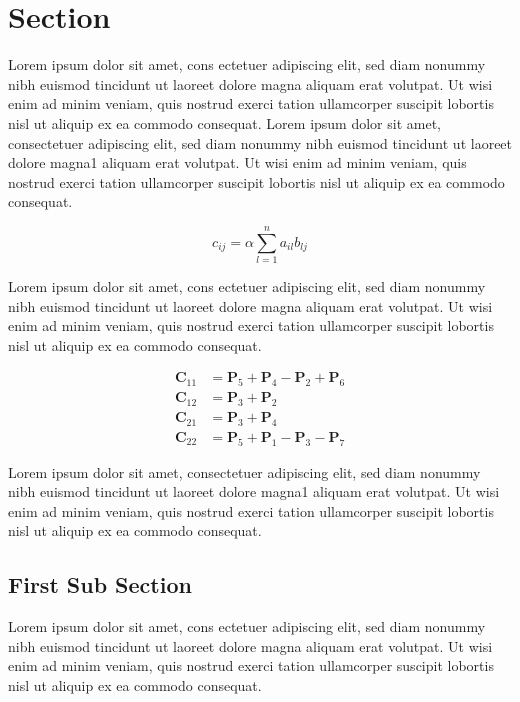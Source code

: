 \section{Section}

Lorem ipsum dolor sit amet, cons ectetuer adipiscing elit, sed diam nonummy nibh euismod tincidunt ut laoreet dolore magna aliquam erat volutpat. Ut wisi enim ad minim veniam, quis nostrud exerci tation ullamcorper suscipit lobortis nisl ut aliquip ex ea commodo consequat.
Lorem ipsum dolor sit amet, consectetuer adipiscing elit, sed diam nonummy nibh euismod tincidunt ut laoreet dolore magna1 aliquam erat volutpat. Ut wisi enim ad minim veniam, quis nostrud exerci tation ullamcorper suscipit lobortis nisl ut aliquip ex ea commodo consequat. 


\begin{equation}
    c_{ij} = \alpha\sum_{l=1}^n a_{il}b_{lj}
    \label{eq: naive matrix mult}
\end{equation}


Lorem ipsum dolor sit amet, cons ectetuer adipiscing elit, sed diam nonummy nibh euismod tincidunt ut laoreet dolore magna aliquam erat volutpat. Ut wisi enim ad minim veniam, quis nostrud exerci tation ullamcorper suscipit lobortis nisl ut aliquip ex ea commodo consequat.

\begin{align*}
    \textbf{C}_{11} &= \textbf{P}_5 + \textbf{P}_4-\textbf{P}_2+\textbf{P}_6\\
    \textbf{C}_{12} &= \textbf{P}_3 + \textbf{P}_2 \\
    \textbf{C}_{21} &= \textbf{P}_3 + \textbf{P}_4 \\
    \textbf{C}_{22} &= \textbf{P}_5 + \textbf{P}_1 - \textbf{P}_3 - \textbf{P}_7
\end{align*}

Lorem ipsum dolor sit amet, consectetuer adipiscing elit, sed diam nonummy nibh euismod tincidunt ut laoreet dolore magna1 aliquam erat volutpat. Ut wisi enim ad minim veniam, quis nostrud exerci tation ullamcorper suscipit lobortis nisl ut aliquip ex ea commodo consequat. 

\subsection{First Sub Section}

Lorem ipsum dolor sit amet, cons ectetuer adipiscing elit, sed diam nonummy nibh euismod tincidunt ut laoreet dolore magna aliquam erat volutpat. Ut wisi enim ad minim veniam, quis nostrud exerci tation ullamcorper suscipit lobortis nisl ut aliquip ex ea commodo consequat.

